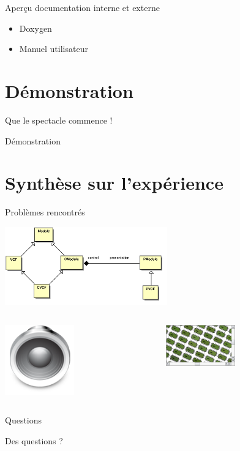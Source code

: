 \documentclass[frenchb]{beamer}
\begin{document}
\begin{frame}{Aperçu documentation interne et externe}
    \begin{itemize}
        \item Doxygen
        \item Manuel utilisateur
    \end{itemize}
\end{frame}

\section{Démonstration}

\begin{frame}{Que le spectacle commence !}
    \begin{center}
        Démonstration
    \end{center}
\end{frame}

\section{Synthèse sur l’expérience}

\begin{frame}{Problèmes rencontrés}
    \begin{center}
        \includegraphics[width=7cm]{../img/ps/pacmodule-psm.pdf}
    \end{center}
    \pause
    \begin{columns}
        \begin{column}[l]{7cm}
        \includegraphics[width=3cm]{../img/png/arts128x128.png}
        \end{column}
        \pause
        \begin{column}[r]{4cm}
        \includegraphics[width=3cm]{../img/png/graphicsview-view.png}
        \end{column}
    \end{columns}
\end{frame}

\begin{frame}{Questions}
    \begin{center}
        Des questions ?
    \end{center}
\end{frame}
\end{document}
